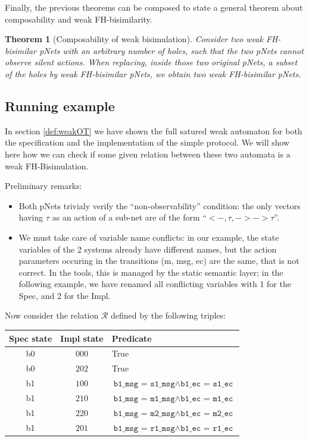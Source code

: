 \documentclass{lmcs}
\newtheorem{theorem}{Theorem}
\begin{document}
Finally, the previous theorems can be composed to state a general theorem about 
composability and weak FH-bisimilarity.

\begin{theorem}[Composability of weak bisimulation]\label{weak-compos}
	Consider two weak FH-bisimilar pNets with an arbitrary number of holes, such that the two pNets cannot observe silent actions. When replacing, 
	inside those two original pNets, a subset of the holes by weak FH-bisimilar pNets, we 
	obtain two weak FH-bisimilar pNets.
\end{theorem}


\subsection{Running example}
In section \ref{def:weakOT} we have shown the full satured weak automaton for both the specification and the implementation of the simple protocol. We will show here how we can check if some given relation between these two automata is a weak FH-Bisimulation. 

\medskip
\noindent
Preliminary remarks:
  \begin{itemize}
    \item Both pNets trivialy verify the ``non-observability''
      condition: the only vectors having $\tau$ as an action of a
      sub-net are of the form ``$< -, \tau, -> -> \tau$''.
    \item We must take care of variable name conflicts: in our example, the state variables of the 2 systems already have different names, but the action parameters occuring in the transitions (m, msg, ec) are the same, that is not correct. In the tools, this is managed by the static semantic layer; in the following example, we have renamed all conflicting variables with 1 for the Spec, and 2 for the Impl.
    \end{itemize}

  \medskip
  Now consider the relation $\mathcal{R}$ defined by the following triples:


  \begin{tabular}{|c|c|l|}
\hline
    Spec state & Impl state & Predicate\\
    \hline
    b0 & $000$ & True\\
    b0 & $202$ & True\\
    b1 & $100$ & $\texttt{b1\_msg = s1\_msg} \land \texttt{b1\_ec = s1\_ec}$\\
    b1 & $210$ & $\texttt{b1\_msg = m1\_msg} \land \texttt{b1\_ec = m1\_ec}$\\
    b1 & $220$ & $\texttt{b1\_msg = m2\_msg} \land \texttt{b1\_ec = m2\_ec}$\\
    b1 & $201$ & $\texttt{b1\_msg = r1\_msg} \land \texttt{b1\_ec = r1\_ec}$\\
    \hline
    \end{tabular}
\end{document}
